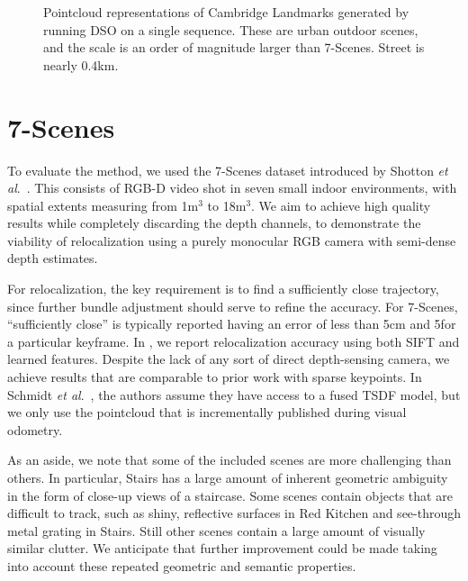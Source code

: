 \begin{figure}
	\caption{Pointcloud representations of Cambridge Landmarks generated by running DSO on a single sequence. These are urban outdoor scenes, and the scale is an order of magnitude larger than 7-Scenes. Street is nearly 0.4km.}
	\label{fig:visualodometry_cambridge}
\end{figure}

\section{7-Scenes}

To evaluate the method, we used the 7-Scenes dataset introduced by Shotton \textit{et al}.\ \cite{shotton2013scene}. This consists of RGB-D video shot in seven small indoor environments, with spatial extents measuring from 1m$^3$ to 18m$^3$. We aim to achieve high quality results while completely discarding the depth channels, to demonstrate the viability of relocalization using a purely monocular RGB camera with semi-dense depth estimates.

For relocalization, the key requirement is to find a sufficiently close trajectory, since further bundle adjustment should serve to refine the accuracy. For 7-Scenes, ``sufficiently close'' is typically reported having an error of less than 5cm and 5\textdegree for a particular keyframe. In , we report relocalization accuracy using both SIFT and learned features. Despite the lack of any sort of direct depth-sensing camera, we achieve results that are comparable to prior work with sparse keypoints. In Schmidt \textit{et al}.\ \cite{schmidt2017self}, the authors assume they have access to a fused TSDF model, but we only use the pointcloud that is incrementally published during visual odometry.

As an aside, we note that some of the included scenes are more challenging than others. In particular, Stairs has a large amount of inherent geometric ambiguity in the form of close-up views of a staircase. Some scenes contain objects that are difficult to track, such as shiny, reflective surfaces in Red Kitchen and see-through metal grating in Stairs. Still other scenes contain a large amount of visually similar clutter. We anticipate that further improvement could be made taking into account these repeated geometric and semantic properties.

